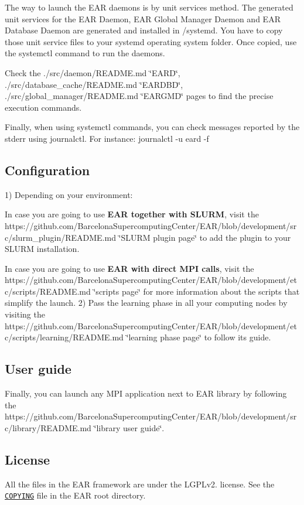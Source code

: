 The way to launch the E\+AR daemons is by unit services method. The generated unit services for the E\+AR Daemon, E\+AR Global Manager Daemon and E\+AR Database Daemon are generated and installed in {\ttfamily /systemd}. You have to copy those unit service files to your {\ttfamily systemd} operating system folder. Once copied, use the {\ttfamily systemctl} command to run the daemons.

Check the ./src/daemon/\+R\+E\+A\+D\+ME.md \char`\"{}\+E\+A\+R\+D\char`\"{}, ./src/database\+\_\+cache/\+R\+E\+A\+D\+ME.md \char`\"{}\+E\+A\+R\+D\+B\+D\char`\"{}, ./src/global\+\_\+manager/\+R\+E\+A\+D\+ME.md \char`\"{}\+E\+A\+R\+G\+M\+D\char`\"{} pages to find the precise execution commands.

Finally, when using {\ttfamily systemctl} commands, you can check messages reported by the stderr using journalctl. For instance\+: {\ttfamily journalctl -\/u eard -\/f}

\subsection*{Configuration }

1) Depending on your environment\+:
\begin{DoxyItemize}
\item In case you are going to use {\bfseries E\+AR together with S\+L\+U\+RM}, visit the https\+://github.com/\+Barcelona\+Supercomputing\+Center/\+E\+A\+R/blob/development/src/slurm\+\_\+plugin/\+R\+E\+A\+D\+M\+E.\+md \char`\"{}\+S\+L\+U\+R\+M plugin page\char`\"{} to add the plugin to your S\+L\+U\+RM installation.
\item In case you are going to use {\bfseries E\+AR with direct M\+PI calls}, visit the https\+://github.com/\+Barcelona\+Supercomputing\+Center/\+E\+A\+R/blob/development/etc/scripts/\+R\+E\+A\+D\+M\+E.\+md \char`\"{}scripts page\char`\"{} for more information about the scripts that simplify the launch. 2) Pass the learning phase in all your computing nodes by visiting the https\+://github.com/\+Barcelona\+Supercomputing\+Center/\+E\+A\+R/blob/development/etc/scripts/learning/\+R\+E\+A\+D\+M\+E.\+md \char`\"{}learning phase page\char`\"{} to follow its guide.
\end{DoxyItemize}

\subsection*{User guide }

Finally, you can launch any M\+PI application next to E\+AR library by following the https\+://github.com/\+Barcelona\+Supercomputing\+Center/\+E\+A\+R/blob/development/src/library/\+R\+E\+A\+D\+M\+E.\+md \char`\"{}library user guide\char`\"{}.

\subsection*{License }

All the files in the E\+AR framework are under the L\+G\+P\+Lv2. license. See the \href{../../COPYING}{\tt C\+O\+P\+Y\+I\+NG} file in the E\+AR root directory. 